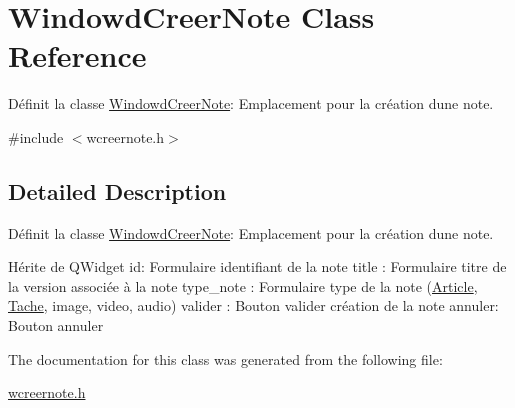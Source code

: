 \hypertarget{class_windowd_creer_note}{}\section{Windowd\+Creer\+Note Class Reference}
\label{class_windowd_creer_note}


Définit la classe \hyperlink{class_windowd_creer_note}{Windowd\+Creer\+Note}\+: Emplacement pour la création d\textquotesingle{}une note.  




{\ttfamily \#include $<$wcreernote.\+h$>$}



\subsection{Detailed Description}
Définit la classe \hyperlink{class_windowd_creer_note}{Windowd\+Creer\+Note}\+: Emplacement pour la création d\textquotesingle{}une note. 

Hérite de Q\+Widget id\+: Formulaire identifiant de la note title \+: Formulaire titre de la version associée à la note type\+\_\+note \+: Formulaire type de la note (\hyperlink{class_article}{Article}, \hyperlink{class_tache}{Tache}, image, video, audio) valider \+: Bouton valider création de la note annuler\+: Bouton annuler 

The documentation for this class was generated from the following file\+:\begin{DoxyCompactItemize}
\item 
\hyperlink{wcreernote_8h}{wcreernote.\+h}\end{DoxyCompactItemize}
